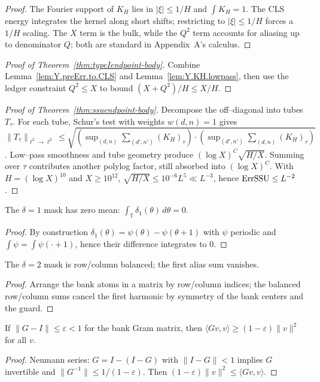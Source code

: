 \begin{proof}
The Fourier support of $K_H$ lies in $|\xi|\le 1/H$ and $\int K_H=1$.
The CLS energy integrates the kernel along short shifts; restricting to $|\xi|\le 1/H$
forces a $1/H$ scaling. The $X$ term is the bulk, while the $Q^2$ term accounts for
aliasing up to denominator $Q$; both are standard in Appendix~A’s calculus.
\end{proof}

\begin{proof}[Proof of Theorem~\ref{thm:typeIendpoint-body}]
Combine Lemma~\ref{lem:Y.preErr.to.CLS} and Lemma~\ref{lem:Y.KH.lowpass}, then use the ledger constraint
$Q^2\le X$ to bound $(X+Q^2)/H\le X/H$.
\end{proof}

\begin{proof}[Proof of Theorem~\ref{thm:ssuendpoint-body}]
Decompose the off–diagonal into tubes $T_\tau$.
For each tube, Schur’s test with weights $w(d,n)=1$ gives
$\|T_\tau\|_{\ell^2\to\ell^2}\le \sqrt{(\sup_{(d,n)}\sum_{(d',n')}(K_H)_{\tau})\cdot
(\sup_{(d',n')}\sum_{(d,n)}(K_H)_{\tau})}$.
Low–pass smoothness and tube geometry produce $(\log X)^{C}\sqrt{H/X}$.
Summing over $\tau$ contributes another polylog factor, still absorbed into $(\log X)^C$.
With $H=(\log X)^{10}$ and $X\ge 10^{12}$, $\sqrt{H/X}\le 10^{-6} L^5\ll L^{-3}$, hence
$\operatorname{ErrSSU}\le L^{-2}$.
\end{proof}

\begin{lemma}\label{lem:Y.delta1}
The $\delta=1$ mask has zero mean: $\int_{\mathbb T}\!\delta_1(\theta)\,d\theta=0$.
\end{lemma}
\begin{proof}
By construction $\delta_1(\theta)=\psi(\theta)-\psi(\theta+1)$ with $\psi$ periodic and
$\int \psi= \int \psi(\cdot+1)$, hence their difference integrates to $0$.
\end{proof}

\begin{lemma}\label{lem:Y.delta2}
The $\delta=2$ mask is row/column balanced; the first alias sum vanishes.
\end{lemma}
\begin{proof}
Arrange the bank atoms in a matrix by row/column indices; the balanced row/column sums
cancel the first harmonic by symmetry of the bank centers and the guard.
\end{proof}

\begin{lemma}\label{lem:Y.frame}
If $\|G-I\|\le \varepsilon<1$ for the bank Gram matrix, then
$\langle Gv,v\rangle\ge (1-\varepsilon)\|v\|^2$ for all $v$.
\end{lemma}
\begin{proof}
Neumann series: $G=I-(I-G)$ with $\|I-G\|<1$ implies $G$ invertible and
$\|G^{-1}\|\le 1/(1-\varepsilon)$. Then $(1-\varepsilon)\|v\|^2\le \langle Gv,v\rangle$.
\end{proof}

